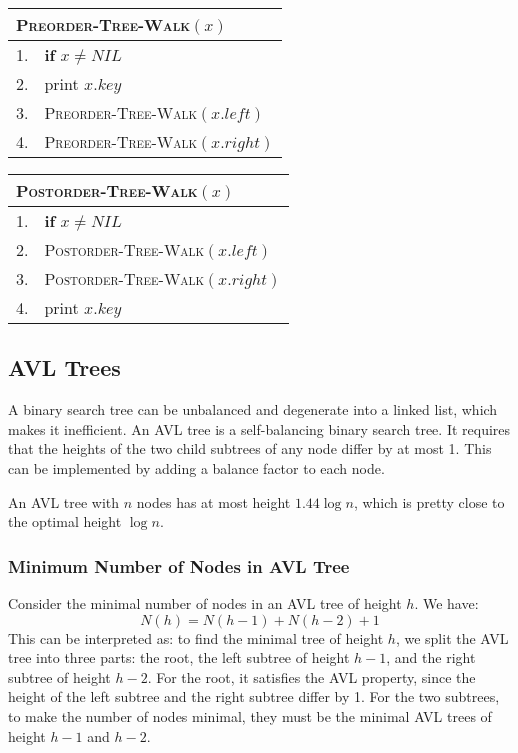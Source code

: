 \documentclass[a4paper,12pt]{article}
\begin{document}
\begin{center}
	\begin{tabular}{rl}
		\toprule
		\multicolumn{2}{l}{\textsc{Preorder-Tree-Walk}$(x)$} \\
		\midrule
		1. & \textbf{if} $x \neq NIL$ \\
		2. & \quad print $x.key$ \\
		3. & \quad \textsc{Preorder-Tree-Walk}$(x.left)$ \\
		4. & \quad \textsc{Preorder-Tree-Walk}$(x.right)$ \\
		\bottomrule
	\end{tabular}
\end{center}

\begin{center}
	\begin{tabular}{rl}
		\toprule
		\multicolumn{2}{l}{\textsc{Postorder-Tree-Walk}$(x)$} \\
		\midrule
		1. & \textbf{if} $x \neq NIL$ \\
		2. & \quad \textsc{Postorder-Tree-Walk}$(x.left)$ \\
		3. & \quad \textsc{Postorder-Tree-Walk}$(x.right)$ \\
		4. & \quad print $x.key$ \\
		\bottomrule
	\end{tabular}
\end{center}

\subsection{AVL Trees}

A binary search tree can be unbalanced and degenerate into a linked list, which makes it inefficient.
An AVL tree is a self-balancing binary search tree.
It requires that the heights of the two child subtrees of any node differ by at most 1.
This can be implemented by adding a balance factor to each node.

An AVL tree with $n$ nodes has at most height $1.44 \log n$, which is pretty close to the optimal height $\log n$.

\subsubsection{Minimum Number of Nodes in AVL Tree}

Consider the minimal number of nodes in an AVL tree of height $h$.
We have:
\begin{equation*}
	N(h) = N(h - 1) + N(h - 2) + 1
\end{equation*}
This can be interpreted as: to find the minimal tree of height $h$, we split the AVL tree into three parts: the root, the left subtree of height $h - 1$, and the right subtree of height $h - 2$.
For the root, it satisfies the AVL property, since the height of the left subtree and the right subtree differ by 1.
For the two subtrees, to make the number of nodes minimal, they must be the minimal AVL trees of height $h - 1$ and $h - 2$.
\end{document}
